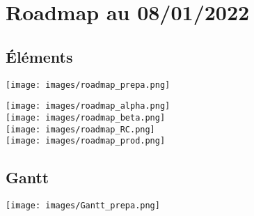 \section{Roadmap au 08/01/2022}

\subsection{Éléments}

\noindent%
\texttt{[image: images/roadmap\_prepa.png]}

\noindent%
\texttt{[image: images/roadmap\_alpha.png]}\\
\texttt{[image: images/roadmap\_beta.png]}\\
\texttt{[image: images/roadmap\_RC.png]}\\
\texttt{[image: images/roadmap\_prod.png]}

\subsection{Gantt}

\noindent%
\texttt{[image: images/Gantt\_prepa.png]}
